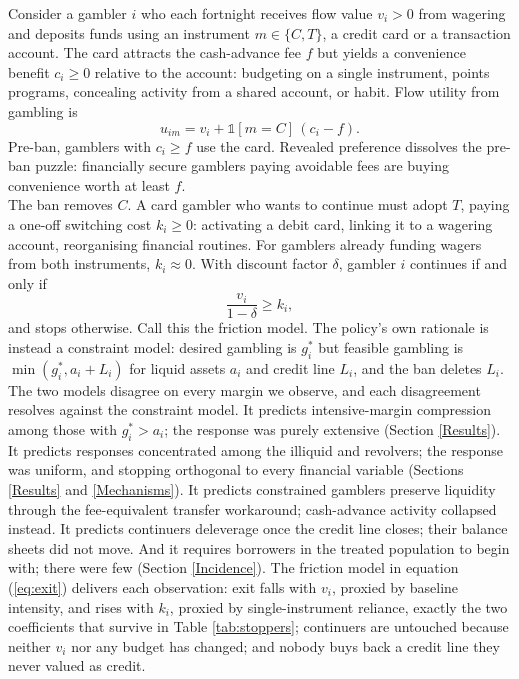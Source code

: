 \documentclass[11pt]{article}
\begin{document}
Consider a gambler $i$ who each fortnight receives flow value $v_i > 0$ from wagering and deposits funds using an instrument $m \in \{C, T\}$, a credit card or a transaction account. The card attracts the cash-advance fee $f$ but yields a convenience benefit $c_i \geq 0$ relative to the account: budgeting on a single instrument, points programs, concealing activity from a shared account, or habit. Flow utility from gambling is
\begin{equation}
    u_{im} = v_i + \mathbb{1}[m = C]\,(c_i - f).
\end{equation}
Pre-ban, gamblers with $c_i \geq f$ use the card. Revealed preference dissolves the pre-ban puzzle: financially secure gamblers paying avoidable fees are buying convenience worth at least $f$.\\

The ban removes $C$. A card gambler who wants to continue must adopt $T$, paying a one-off switching cost $k_i \geq 0$: activating a debit card, linking it to a wagering account, reorganising financial routines. For gamblers already funding wagers from both instruments, $k_i \approx 0$. With discount factor $\delta$, gambler $i$ continues if and only if
\begin{equation} \label{eq:exit}
    \frac{v_i}{1-\delta} \geq k_i,
\end{equation}
and stops otherwise. Call this the friction model. The policy's own rationale is instead a constraint model: desired gambling is $g_i^*$ but feasible gambling is $\min(g_i^*, a_i + L_i)$ for liquid assets $a_i$ and credit line $L_i$, and the ban deletes $L_i$.\\

The two models disagree on every margin we observe, and each disagreement resolves against the constraint model. It predicts intensive-margin compression among those with $g_i^* > a_i$; the response was purely extensive (Section \ref{Results}). It predicts responses concentrated among the illiquid and revolvers; the response was uniform, and stopping orthogonal to every financial variable (Sections \ref{Results} and \ref{Mechanisms}). It predicts constrained gamblers preserve liquidity through the fee-equivalent transfer workaround; cash-advance activity collapsed instead. It predicts continuers deleverage once the credit line closes; their balance sheets did not move. And it requires borrowers in the treated population to begin with; there were few (Section \ref{Incidence}). The friction model in equation (\ref{eq:exit}) delivers each observation: exit falls with $v_i$, proxied by baseline intensity, and rises with $k_i$, proxied by single-instrument reliance, exactly the two coefficients that survive in Table \ref{tab:stoppers}; continuers are untouched because neither $v_i$ nor any budget has changed; and nobody buys back a credit line they never valued as credit.
\end{document}
